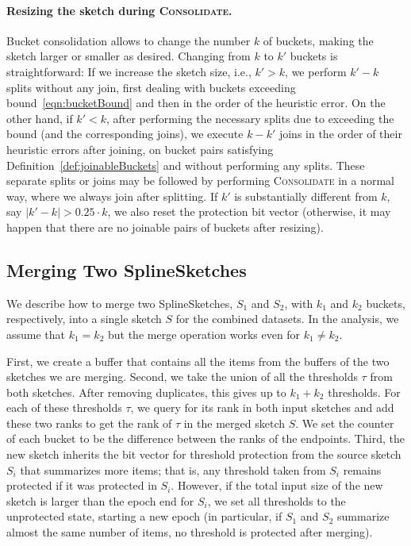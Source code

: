 \documentclass[acmsmall]{acmart}
\newcommand{\consolidate}{\textsc{Consolidate}\xspace}
\theoremstyle{remark}
\begin{document}
\paragraph{Resizing the sketch during \consolidate.}
Bucket consolidation allows to change the number $k$ of buckets,
making the sketch larger or smaller as desired.
Changing from $k$ to $k'$ buckets is straightforward: 
If we increase the sketch size, i.e., $k' > k$, we perform $k' - k$ splits
without any join, first dealing with buckets exceeding bound~\eqref{eqn:bucketBound} and then in the order of the heuristic error.
On the other hand, if $k' < k$, after performing the necessary splits due to exceeding the bound (and the corresponding joins),
we execute $k - k'$ joins
in the order of their heuristic errors after joining, on bucket pairs satisfying Definition~\ref{def:joinableBuckets} and without performing any splits.
These separate splits or joins may be followed by performing \consolidate in a normal way, where we always join after splitting. %
If $k'$ is substantially different from $k$, say $|k' - k| > 0.25\cdot k$, we also %
reset the protection bit vector (otherwise, it may happen that there are no joinable pairs of buckets after resizing).

 



\subsection{Merging Two SplineSketches}\label{sec:mergeOp}

We describe how to merge two SplineSketches, $S_1$ and $S_2$, with $k_1$ and $k_2$ buckets, respectively, into a single sketch $S$ for the combined datasets.
In the analysis, we assume that  $k_1 = k_2$ but the merge operation works even for $k_1 \neq k_2$.

	
First, we create a buffer that contains all the items from the buffers of the two sketches we are merging.
Second, we take the union of all the thresholds $\tau$ from both sketches. After removing duplicates, this gives up to $k_1+k_2$ thresholds. For each of these thresholds $\tau$, we query for its rank in both input sketches and add these two ranks to get the rank of $\tau$ in the merged sketch $S$. We set the counter of each bucket to be the difference between the ranks of the endpoints.
Third, the new sketch inherits the bit vector for threshold protection from the source sketch $S_i$ that summarizes more items; that is, any threshold taken from $S_i$ remains protected if it was protected in $S_i$. However, if the total input size of the new sketch is larger than the epoch end for $S_i$, we set all thresholds to the unprotected state, starting a new epoch (in particular, if $S_1$ and $S_2$ summarize almost the same number of items, no threshold is protected after merging).
\end{document}
